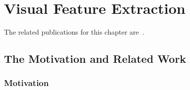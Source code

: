 \chapter{Visual Feature Extraction}
\label{chap:visuals}

\ifpdf
    \graphicspath{{AD/fig/PNG/}{AD/fig/PDF/}{AD/fig/}}
\else
    \graphicspath{{AD/fig/EPS/}{AD/fig/}}
\fi

The related publications for this chapter are~\cite{}.

\section{The  Motivation and Related Work}
\subsection{Motivation}
